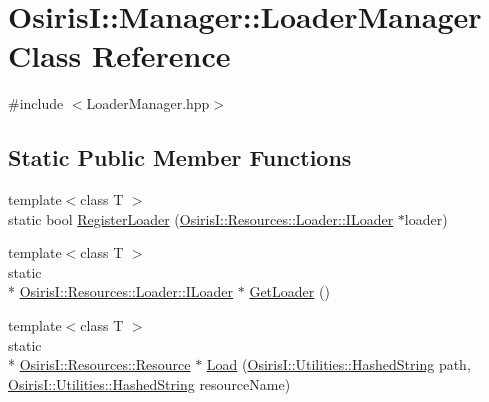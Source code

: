 \hypertarget{class_osiris_i_1_1_manager_1_1_loader_manager}{\section{Osiris\-I\-:\-:Manager\-:\-:Loader\-Manager Class Reference}
\label{class_osiris_i_1_1_manager_1_1_loader_manager}
}


{\ttfamily \#include $<$Loader\-Manager.\-hpp$>$}

\subsection*{Static Public Member Functions}
\begin{DoxyCompactItemize}
\item 
{\footnotesize template$<$class T $>$ }\\static bool \hyperlink{class_osiris_i_1_1_manager_1_1_loader_manager_ac2c97943fea878dc2477c73e133dc659}{Register\-Loader} (\hyperlink{class_osiris_i_1_1_resources_1_1_loader_1_1_i_loader}{Osiris\-I\-::\-Resources\-::\-Loader\-::\-I\-Loader} $\ast$loader)
\item 
{\footnotesize template$<$class T $>$ }\\static \\*
\hyperlink{class_osiris_i_1_1_resources_1_1_loader_1_1_i_loader}{Osiris\-I\-::\-Resources\-::\-Loader\-::\-I\-Loader} $\ast$ \hyperlink{class_osiris_i_1_1_manager_1_1_loader_manager_a45e6f3557a05efecc12d4768aa7efa5b}{Get\-Loader} ()
\item 
{\footnotesize template$<$class T $>$ }\\static \\*
\hyperlink{class_osiris_i_1_1_resources_1_1_resource}{Osiris\-I\-::\-Resources\-::\-Resource} $\ast$ \hyperlink{class_osiris_i_1_1_manager_1_1_loader_manager_a6f44e056481b4f3065f9a6a693ac6eae}{Load} (\hyperlink{class_osiris_i_1_1_utilities_1_1_hashed_string}{Osiris\-I\-::\-Utilities\-::\-Hashed\-String} path, \hyperlink{class_osiris_i_1_1_utilities_1_1_hashed_string}{Osiris\-I\-::\-Utilities\-::\-Hashed\-String} resource\-Name)
\end{DoxyCompactItemize}


